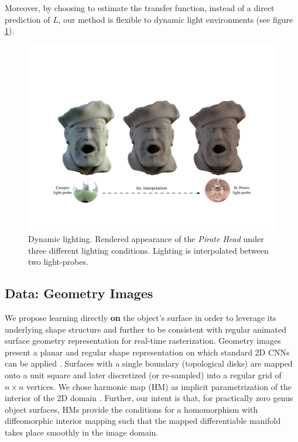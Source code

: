 Moreover, by choosing to estimate the transfer function, instead of a direct prediction of $L$, our method is flexible to dynamic light environments (see figure \ref{Fig: Varying lighting}).
\begin{figure}[H]
  \centering
    \includegraphics[width=1.0\textwidth]{Figures/varying_lighting}
     \caption{Dynamic lighting. Rendered appearance of the \textit{Pirate Head} under three different  lighting conditions. Lighting is interpolated between two light-probes.}
     \label{Fig: Varying lighting}
\end{figure}
\subsection{Data: Geometry Images}
We propose learning directly \textbf{on} the object's surface in order to leverage its underlying shape structure and further to be consistent with regular animated surface geometry representation for real-time rasterization. Geometry images present a planar and regular shape representation on which standard 2D CNNs can be applied \cite{gu2002geometry, sinha2016deep}. Surfaces with a single boundary (topological disks) are mapped onto a unit square and later discretized (or re-sampled) into a regular grid of $n \times n$ vertices. We chose harmonic map (HM) as implicit parametrization of the interior of the 2D domain \cite{HM_book, HarmonicMapping}. Further, our intent is that, for practically zero genus object surfaces, HMs provide the conditions for a homomorphism with diffeomorphic interior mapping such that the mapped differentiable manifold takes place smoothly in the image domain.

